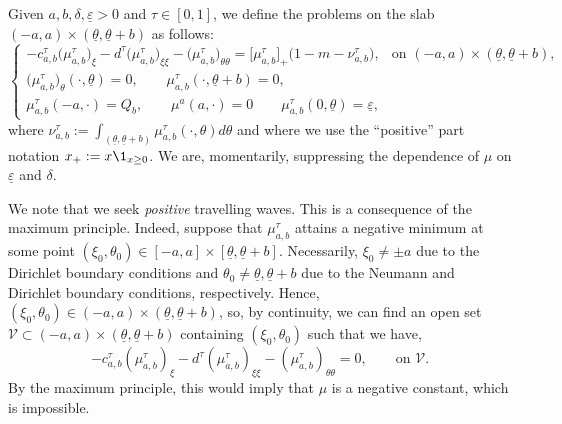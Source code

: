 \documentclass[11pt]{article}    %
\renewcommand{\epsilon}{\varepsilon}
\newcommand{\eps}{\varepsilon}
\begin{document}
Given $a,b, \delta, \underline\epsilon >0$ and $\tau \in [0,1]$, we define the problems %
on the slab $(-a,a) \times (\underline\theta, \underline\theta + b)$ as follows:
\begin{equation}\label{eq:slab}
\begin{cases}
		-c_{a,b}^\tau \big( \mu_{a,b}^\tau \big)_\xi  - d^\tau \big( \mu_{a,b}^\tau \big)_{\xi \xi} -  \big( \mu_{a,b}^\tau \big)_{\theta\theta} =\big[ \mu_{a,b}^\tau \big]_+ \big(1 - m - \nu_{a,b}^\tau \big),&\text{on } (-a,a) \times (\underline\theta, \underline\theta + b), \\
		\big( \mu_{a,b}^\tau \big)_{\theta}   (\cdot, \underline \theta ) = 0,
		\qquad \mu_{a,b}^\tau(\cdot, \underline \theta + b ) = 0,\\
		\mu_{a,b}^\tau(-a,\cdot) = Q_b  , \qquad \mu^a(a,\cdot)  = 0
		\qquad \mu_{a,b}^\tau(0,\underline\theta) = \underline\eps,
\end{cases}
\end{equation}
where $\nu_{a,b}^\tau := \int_{(\underline\theta, \underline\theta + b)} \mu_{a,b}^\tau(\cdot,\theta) d\theta$ and where we use the ``positive'' part notation $x_+ := x \1_{x\geq 0}$.  We are, momentarily, suppressing the dependence of $\mu$ on $\underline\epsilon$ and $\delta$.

We note that we seek {\em positive} travelling waves.  This is a consequence of the maximum principle. %
Indeed, suppose that $\mu_{a,b}^\tau$ attains a negative minimum at some point $(\xi_0,\theta_0) \in [-a,a] \times [\underline\theta, \underline\theta + b]$. Necessarily, $\xi_0 \neq \pm a$ due to the Dirichlet boundary conditions and $\theta_0 \neq \underline \theta, \underline\theta+b$ due to the Neumann and Dirichlet boundary conditions, respectively. Hence, $(\xi_0,\theta_0) \in (-a,a) \times (\underline\theta, \underline\theta + b)$, so, by continuity, we can find an open set $\mathcal{V} \subset (-a,a) \times (\underline\theta, \underline\theta + b)$ containing $(\xi_0,\theta_0)$ such that we  have,  
\begin{equation*}
-c_{a,b}^\tau \left( \mu_{a,b}^\tau \right)_\xi  - d^\tau \left( \mu_{a,b}^\tau \right)_{\xi \xi} -  \left( \mu_{a,b}^\tau \right)_{\theta\theta} = 0, \qquad \text{on } \mathcal{V}.
\end{equation*}
By the maximum principle, this would imply that $\mu$ is a negative constant, which is impossible. 
\end{document}
